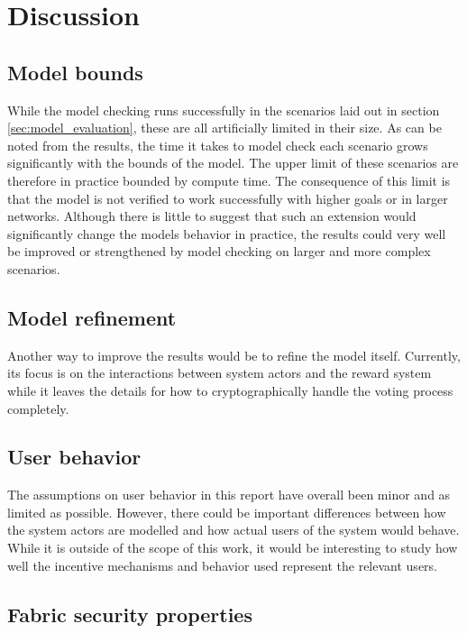 \chapter{Discussion}
\label{ch:discussion}

\section{Model bounds}

While the model checking runs successfully in the scenarios laid out in section \ref{sec:model_evaluation}, these are all artificially limited in their size. As can be noted from the results, the time it takes to model check each scenario grows significantly with the bounds of the model. The upper limit of these scenarios are therefore in practice bounded by compute time. The consequence of this limit is that the model is not verified to work successfully with higher goals or in larger networks. Although there is little to suggest that such an extension would significantly change the models behavior in practice, the results could very well be improved or strengthened by model checking on larger and more complex scenarios.

\section{Model refinement}

Another way to improve the results would be to refine the model itself. Currently, its focus is on the interactions between system actors and the reward system while it leaves the details for how to cryptographically handle the voting process completely. 


\section{User behavior}

The assumptions on user behavior in this report have overall been minor and as limited as possible. However, there could be important differences between how the system actors are modelled and how actual users of the system would behave. While it is outside of the scope of this work, it would be interesting to study how well the incentive mechanisms and behavior used represent the relevant users.

\section{Fabric security properties}

